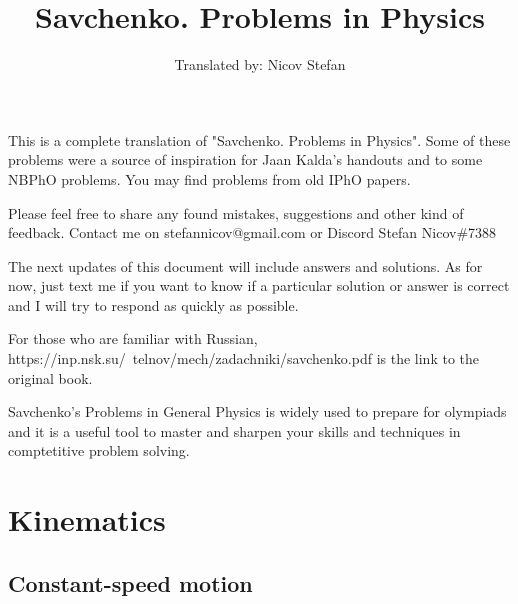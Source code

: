 \documentclass{article}
\title{Savchenko. Problems in Physics}
\author{Translated by: Nicov Stefan}
\begin{document}
\maketitle

This is a complete translation of "Savchenko. Problems in Physics". Some of these problems were a source of inspiration for Jaan Kalda's handouts and to some NBPhO problems. You may find problems from old IPhO papers.

Please feel free to share any found mistakes, suggestions and other kind of feedback. Contact me on stefannicov@gmail.com or Discord Stefan Nicov$\#$7388

The next updates of this document will include answers and solutions. As for now, just text me if you want to know if a particular solution or answer is correct and I will try to respond as quickly as possible.

For those who are familiar with Russian, https://inp.nsk.su/~telnov/mech/zadachniki/savchenko.pdf is the link to the original book. 

Savchenko's Problems in General Physics is widely used to prepare for olympiads and it is a useful tool to master and sharpen your skills  and techniques in comptetitive problem solving.

\newpage
\tableofcontents
\newpage


\section{Kinematics}

\subsection{Constant-speed motion}
\end{document}
